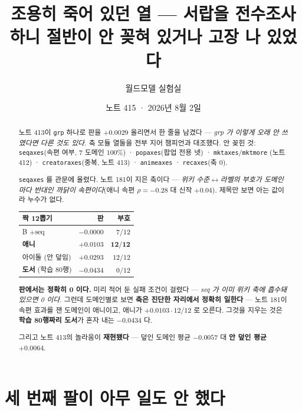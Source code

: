 \documentclass[11pt]{article}
\begin{document}
\title{조용히 죽어 있던 열 --- 서랍을 전수조사하니 절반이 안 꽂혀 있거나 고장 나 있었다}
\author{월드모델 실험실}
\date{노트 415 · 2026년 8월 2일}
\maketitle

\begin{abstract}
노트 413이 \texttt{grp} 하나로 판을 $+0.0029$ 올리면서 한 줄을 남겼다 ---
\emph{grp 가 이렇게 오래 안 쓰였다면 다른 것도 있다.} 축 모듈 열둘을 전부
지어 챔피언과 대조했다. 안 꽂힌 것: \texttt{seqaxes}(속편 여부, 7 도메인
$100\%$) · \texttt{popaxes}(팝업 전용 넷) · \texttt{mktaxes}/\texttt{mktmore}
(노트 412) · \texttt{creatoraxes}(중복, 노트 413) · \texttt{animeaxes} ·
\texttt{recaxes}(축 0).

\texttt{seqaxes} 를 관문에 올렸다. 노트 181이 지은 축이다 --- \emph{위키
수준$\leftrightarrow$라벨의 부호가 도메인마다 반대인 까닭이 속편이다}(애니
속편 $\rho{=}-0.28$ 대 신작 $+0.04$). 제목만 보면 아는 값이라 누수가 없다.

\begin{center}
\begin{tabular}{lrr}
\hline
짝 12뽑기 & 판 & 부호 \\
\hline
B $+$seq & $-0.0000$ & $7/12$ \\
\hline
\textbf{애니} & $\mathbf{+0.0103}$ & $\mathbf{12/12}$ \\
아이돌 (안 덮임) & $+0.0293$ & $12/12$ \\
\textbf{도서} (학습 80행) & $\mathbf{-0.0434}$ & $0/12$ \\
\hline
\end{tabular}
\end{center}

\textbf{판에서는 정확히 0 이다.} 미리 적어 둔 실패 조건이 걸렸다 ---
\emph{seq 가 이미 위키 축에 흡수돼 있으면 0 이다.} 그런데 도메인별로 보면
\textbf{축은 진단한 자리에서 정확히 일한다} --- 노트 181이 속편 효과를 잰
도메인이 애니이고, 애니가 $+0.0103 \cdot 12/12$ 로 오른다. 그것을 지우는
것은 \textbf{학습 80행짜리 도서}가 혼자 내는 $-0.0434$ 다.

그리고 노트 413의 놀라움이 \textbf{재현됐다} --- 덮인 도메인 평균
$-0.0057$ 대 \textbf{안 덮인 평균 $+0.0064$}.
\end{abstract}

\section{세 번째 팔이 아무 일도 안 했다}
\end{document}
